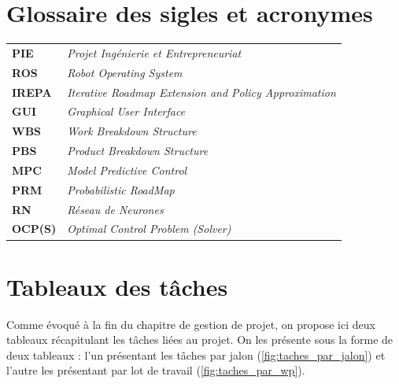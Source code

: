 \documentclass[a4paper,12pt]{report}
\begin{document}
\newpage
\begin{small}
	
	
\end{small}


\newpage
\chapter*{Glossaire des sigles et acronymes}

\begin{tabular}{ >{\bfseries}l  >{\itshape}l  }
PIE & Projet Ingénierie et Entrepreneuriat \\
ROS & Robot Operating System \\
IREPA & Iterative Roadmap Extension and Policy Approximation \\
GUI & Graphical User Interface \\
WBS & Work Breakdown Structure \\
PBS & Product Breakdown Structure \\
MPC & Model Predictive Control \\
PRM & Probabilistic RoadMap \\
RN & Réseau de Neurones \\
OCP(S) & Optimal Control Problem (Solver) \\

\end{tabular}




\newpage
\appendix

\chapter{Tableaux des tâches}
Comme évoqué à la fin du chapitre de gestion de projet, on propose ici deux tableaux récapitulant les tâches liées au projet. On les présente sous la forme de deux tableaux : l'un présentant les tâches par jalon (\ref{fig:taches_par_jalon}) et l'autre les présentant par lot de travail (\ref{fig:taches_par_wp}).
\end{document}
